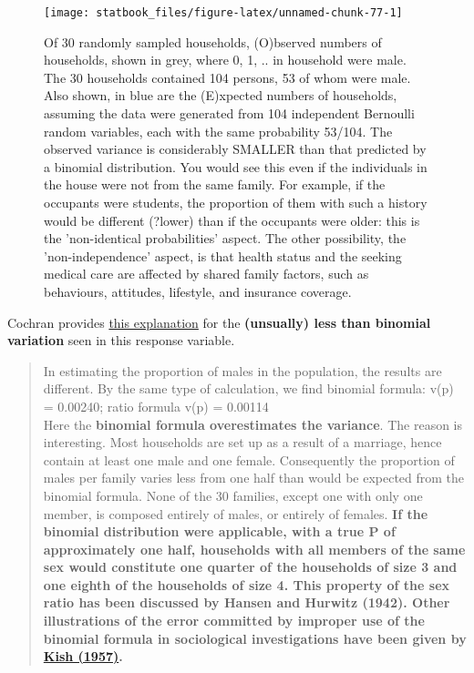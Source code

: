 \documentclass[]{book}
\begin{document}
\begin{figure}

\texttt{[image: statbook\_files/figure-latex/unnamed-chunk-77-1]} \hfill{}

\caption{Of 30 randomly sampled households, (O)bserved  numbers of households, shown in grey, where 0, 1, .. in household were male. The 30 households contained 104 persons, 53 of whom were male. Also shown, in blue are the (E)xpected numbers of households, assuming the data were generated from 104 independent Bernoulli random variables, each with the same  probability 53/104. The observed variance is considerably SMALLER than that predicted by a binomial distribution. You would see this even if the individuals in the house were not from the same family. For example, if the occupants were students, the proportion of them with such a history would be different (?lower) than if the occupants were older: this is the 'non-identical probabilities' aspect. The other possibility, the 'non-independence' aspect, is that health status and the seeking medical care are affected by shared family factors, such as behaviours, attitudes, lifestyle, and insurance coverage.}\label{fig:unnamed-chunk-77}
\end{figure}

Cochran provides \href{http://www.biostat.mcgill.ca/hanley/statbook/CochranHouseholdSurvey.png}{this explanation} for the \textbf{(unsually) less than binomial variation} seen in this response variable.

\begin{quote}
In estimating the proportion of males in the population, the results are different. By the same type of calculation, we find binomial formula: v(p) = 0.00240; ratio formula v(p) = 0.00114\\
Here the \textbf{binomial formula overestimates the variance}. The reason is interesting. Most households are set up as a result of a marriage, hence contain at least one male and one female. Consequently the proportion of males per family varies less from one half than would be expected from the binomial formula. None of the 30 families, except one with only one member, is composed entirely of males, or entirely of females. \textbf{If the binomial distribution were applicable, with a true P of approximately one half, households with all members of the same sex would constitute one quarter of the households of size 3 and one eighth of the households of size 4. This property of the sex ratio has been discussed by Hansen and Hurwitz (1942). Other illustrations of the error committed by improper use of the binomial formula in sociological investigations have been given by \href{http://www.biostat.mcgill.ca/hanley/statbook/Kish1957.pdf}{Kish (1957)}.}
\end{quote}
\end{document}
